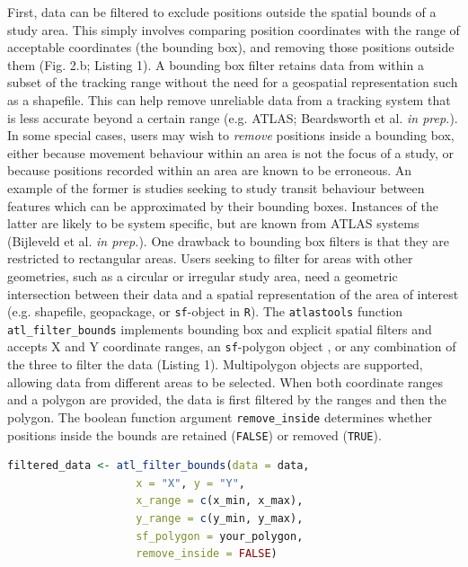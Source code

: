 \documentclass[10pt,paper=a4,headings=standardclasses
]{scrartcl}
\begin{document}
First, data can be filtered to exclude positions outside the spatial bounds of a study area.
This simply involves comparing position coordinates with the range of acceptable coordinates (the bounding box), and removing those positions outside them (Fig. 2.b; Listing 1). 
A bounding box filter retains data from within a subset of the tracking range without the need for a geospatial representation such as a shapefile.
This can help remove unreliable data from a tracking system that is less accurate beyond a certain range (e.g. ATLAS; Beardsworth et al. \textit{in prep.}).
In some special cases, users may wish to \textit{remove} positions inside a bounding box, either because movement behaviour within an area is not the focus of a study, or because positions recorded within an area are known to be erroneous.
An example of the former is studies seeking to study transit behaviour between features which can be approximated by their bounding boxes. 
Instances of the latter are likely to be system specific, but are known from ATLAS systems (Bijleveld et al. \textit{in prep.}). 
One drawback to bounding box filters is that they are restricted to rectangular areas.
Users seeking to filter for areas with other geometries, such as a circular or irregular study area, need a geometric intersection between their data and a spatial representation of the area of interest (e.g. shapefile, geopackage, or \texttt{sf}-object in \texttt{R}).
The \texttt{atlastools} function \texttt{atl\_filter\_bounds} implements bounding box and explicit spatial filters and accepts X and Y coordinate ranges, an \texttt{sf}-polygon object \citep{pebesma2018}, or any combination of the three to filter the data (Listing 1).
Multipolygon objects are supported, allowing data from different areas to be selected.
When both coordinate ranges and a polygon are provided, the data is first filtered by the ranges and then the polygon.
The boolean function argument \texttt{remove\_inside} determines whether positions inside the bounds are retained (\texttt{FALSE}) or removed (\texttt{TRUE}).

\begin{lstlisting}[float,floatplacement=h!,language=R, style=customR, caption = {
    The \texttt{atl\_filter\_bounds} function removes positions outside an area defined by coordinate ranges, a polygon, or all three (\texttt{remove\_inside = FALSE}), or positions inside the area (\texttt{remove\_inside = TRUE}).
    The arguments \texttt{x} and \texttt{y} determine the X and Y coordinate columns, \texttt{x\_range} and \texttt{y\_range} are the filter bounds in a CRS in metres, and the data can be filtered by an \texttt{sf-(MULTI)POLYGON} can be passed using the \texttt{sf\_polygon} argument. 
    \texttt{atl\_filter\_bounds} returns a filtered \texttt{data.table}, which must be saved as an object (here, \texttt{filtered\_data}).}]
filtered_data <- atl_filter_bounds(data = data,
                    x = "X", y = "Y",
                    x_range = c(x_min, x_max),
                    y_range = c(y_min, y_max),
                    sf_polygon = your_polygon,
                    remove_inside = FALSE)
\end{lstlisting}
\end{document}
